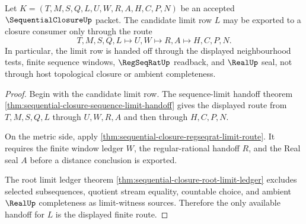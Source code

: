 \begin{theorem}
\label{thm:sequentialclosure-limit-row-handoff}
Let $K=(T,M,S,Q,L,U,W,R,A,H,C,P,N)$ be an accepted $\SequentialClosureUp$ packet. The candidate limit row $L$ may be exported to a closure consumer only through the route
$$
T,M,S,Q,L \longmapsto U,W \longmapsto R,A \longmapsto H,C,P,N .
$$
In particular, the limit row is handed off through the displayed neighbourhood tests, finite sequence windows, $\RegSeqRatUp$ readback, and $\RealUp$ seal, not through host topological closure or ambient completeness.
\end{theorem}
\begin{proof}
Begin with the candidate limit row. The sequence-limit handoff theorem \autoref{thm:sequential-closure-sequence-limit-handoff} gives the displayed route from $T,M,S,Q,L$ through $U,W,R,A$ and then through $H,C,P,N$.

On the metric side, apply \autoref{thm:sequential-closure-regseqrat-limit-route}. It requires the finite window ledger $W$, the regular-rational handoff $R$, and the Real seal $A$ before a distance conclusion is exported.

The root limit ledger theorem \autoref{thm:sequential-closure-root-limit-ledger} excludes selected subsequences, quotient stream equality, countable choice, and ambient $\RealUp$ completeness as limit-witness sources. Therefore the only available handoff for $L$ is the displayed finite route.
\end{proof}

